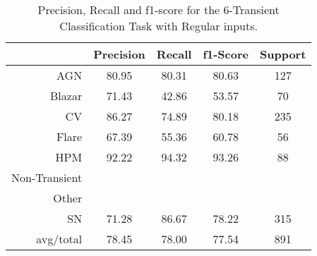 \begin{table}
\centering
\begin{tabular}{|r|c|c|c|c|}
\hline
\multicolumn{1}{|l|}{} & Precision & Recall & f1-Score & Support \\ \hline \hline
AGN                    & 80.95              & 80.31             & 80.63             & 127             \\ \hline
Blazar                 & 71.43           & 42.86          & 53.57          & 70          \\ \hline
CV                     & 86.27               & 74.89              & 80.18              & 235              \\ \hline
Flare                  & 67.39            & 55.36           & 60.78           & 56           \\ \hline
HPM                    & 92.22              & 94.32             & 93.26             & 88             \\ \hline
Non-Transient          &     &    &    &    \\ \hline
Other                  &             &            &            &            \\ \hline
SN                     & 71.28               & 86.67              & 78.22              & 315              \\ \hline
avg/total              & 78.45            & 78.00           & 77.54           & 891           \\ \hline
\end{tabular}
\caption{Precision, Recall and f1-score for the 6-Transient Classification Task with Regular inputs.}
\label{Overall-Scores-6-Transient-Regular}
\end{table}
